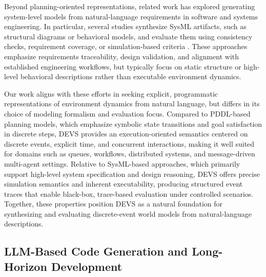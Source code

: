 Beyond planning-oriented representations, related work has explored generating system-level models from natural-language requirements in software and systems engineering. In particular, several studies synthesize SysML artifacts, such as structural diagrams or behavioral models, and evaluate them using consistency checks, requirement coverage, or simulation-based criteria \cite{jin2025sysmbench,acm2023_nl2sysml_requirements,acm2025_llm_sysml_behavior}. These approaches emphasize requirements traceability, design validation, and alignment with established engineering workflows, but typically focus on static structure or high-level behavioral descriptions rather than executable environment dynamics.


Our work aligns with these efforts in seeking explicit, programmatic representations of environment dynamics from natural language, but differs in its choice of modeling formalism and evaluation focus. Compared to PDDL-based planning models, which emphasize symbolic state transitions and goal satisfaction in discrete steps, DEVS provides an execution-oriented semantics centered on discrete events, explicit time, and concurrent interactions, making it well suited for domains such as queues, workflows, distributed systems, and message-driven multi-agent settings. Relative to SysML-based approaches, which primarily support high-level system specification and design reasoning, DEVS offers precise simulation semantics and inherent executability, producing structured event traces that enable black-box, trace-based evaluation under controlled scenarios. Together, these properties position DEVS as a natural foundation for synthesizing and evaluating discrete-event world models from natural-language descriptions.

\subsection{LLM-Based Code Generation and Long-Horizon Development}


